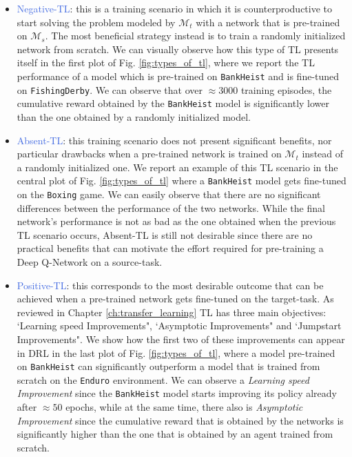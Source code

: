 \begin{itemize}
	\item\textcolor{RoyalBlue}{Negative-TL}: this is a training scenario in which it is counterproductive to start solving the problem modeled by $\mathcal{M}_t$ with a network that is pre-trained on $\mathcal{M}_s$. The most beneficial strategy instead is to train a randomly initialized network from scratch. We can visually observe how this type of TL presents itself in the first plot of Fig. \ref{fig:types_of_tl}, where we report the TL performance of a model which is pre-trained on \texttt{BankHeist} and is fine-tuned on \texttt{FishingDerby}.
   We can observe that over $\approx 3000$ training episodes, the cumulative reward obtained by the \texttt{BankHeist} model is significantly lower than the one obtained by a randomly initialized model.        
    
    \item\textcolor{RoyalBlue}{Absent-TL}: this training scenario does not present significant benefits, nor particular drawbacks when a pre-trained network is trained on $\mathcal{M}_t$ instead of a randomly initialized one. We report an example of this TL scenario in the central plot of Fig. \ref{fig:types_of_tl} where a \texttt{BankHeist} model gets fine-tuned on the \texttt{Boxing} game. We can easily observe that there are no significant differences between the performance of the two networks. While the final network's performance is not as bad as the one obtained when the previous TL scenario occurs, Absent-TL is still not desirable since there are no practical benefits that can motivate the effort required for pre-training a Deep Q-Network on a source-task.
    
    \item\textcolor{RoyalBlue}{Positive-TL}: this corresponds to the most desirable outcome that can be achieved when a pre-trained network gets fine-tuned on the target-task. As reviewed in Chapter \ref{ch:transfer_learning} TL has three main objectives: `Learning speed Improvements", `Asymptotic Improvements" and `Jumpstart Improvements". We show how the first two of these improvements can appear in DRL in the last plot of Fig. \ref{fig:types_of_tl}, where a model pre-trained on \texttt{BankHeist} can significantly outperform a model that is trained from scratch on the \texttt{Enduro} environment. We can observe a \textit{Learning speed Improvement} since the \texttt{BankHeist} model starts improving its policy already after $\approx 50$ epochs, while at the same time, there also is \textit{Asymptotic Improvement} since the cumulative reward that is obtained by the networks is significantly higher than the one that is obtained by an agent trained from scratch. 
\end{itemize}



